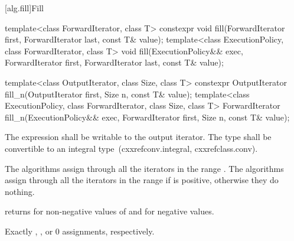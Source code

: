 [alg.fill]{Fill}

%
%
\begin{itemdecl}
template<class ForwardIterator, class T>
  constexpr void fill(ForwardIterator first, ForwardIterator last, const T& value);
template<class ExecutionPolicy, class ForwardIterator, class T>
  void fill(ExecutionPolicy&& exec,
            ForwardIterator first, ForwardIterator last, const T& value);

template<class OutputIterator, class Size, class T>
  constexpr OutputIterator fill_n(OutputIterator first, Size n, const T& value);
template<class ExecutionPolicy, class ForwardIterator, class Size, class T>
  ForwardIterator fill_n(ExecutionPolicy&& exec,
                         ForwardIterator first, Size n, const T& value);

\end{itemdecl}

\begin{itemdescr}
\pnum
\requires
The expression
shall be writable to the output iterator. The type
shall be convertible to an integral type~(cxxref{conv.integral}, cxxref{class.conv}).

\pnum
\effects
The  algorithms assign  through all the iterators in the range
. The  algorithms assign 
through all the iterators in the range 
if  is positive, otherwise they do nothing.

\pnum
\returns {} returns  for non-negative values of 
and  for negative values.

\pnum
\complexity
Exactly
,
, or 0 assignments, respectively.
\end{itemdescr}

